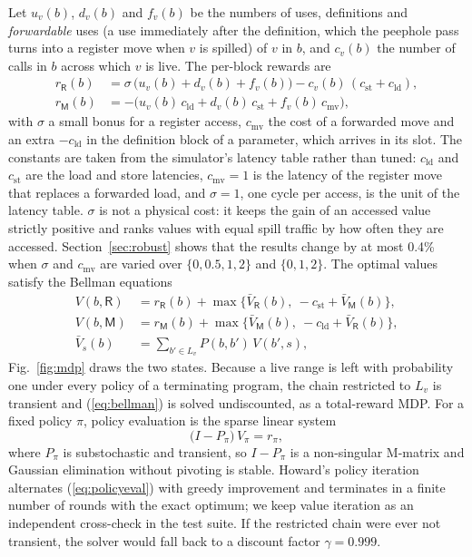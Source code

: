 \documentclass{ieeeaccess}
\newcommand{\Reg}{\mathsf{R}}
\newcommand{\Mem}{\mathsf{M}}
\newcommand{\cld}{c_{\mathrm{ld}}}
\newcommand{\cst}{c_{\mathrm{st}}}
\newcommand{\csv}{\sigma}
\newcommand{\cmv}{c_{\mathrm{mv}}}
\begin{document}
Let $u_v(b)$, $d_v(b)$ and $f_v(b)$ be the numbers of uses,
definitions and \emph{forwardable} uses (a use immediately after the
definition, which the peephole pass turns into a register move when $v$
is spilled) of $v$ in $b$, and $c_v(b)$ the number of calls in $b$
across which $v$ is live. The per-block rewards are
\begin{equation}
\begin{aligned}
r_\Reg(b) &= \csv\,\big(u_v(b)+d_v(b)+f_v(b)\big)-c_v(b)\,(\cst+\cld),\\
r_\Mem(b) &= -\big(u_v(b)\,\cld + d_v(b)\,\cst + f_v(b)\,\cmv\big),
\end{aligned}
\label{eq:reward}
\end{equation}
with $\csv$ a small bonus for a register access, $\cmv$ the cost of a
forwarded move and an extra $-\cld$ in the definition block of a
parameter, which arrives in its slot. The constants are taken from the
simulator's latency table rather than tuned: $\cld$ and $\cst$ are the
load and store latencies, $\cmv=1$ is the latency of the register move
that replaces a forwarded load, and $\csv=1$, one cycle per access,
is the unit of the latency table. $\csv$ is not a physical cost: it
keeps the gain of an accessed value strictly positive and ranks values
with equal spill traffic by how often they are accessed.
Section~\ref{sec:robust} shows that the results change by at most
0.4\% when $\csv$ and $\cmv$ are varied over $\{0,0.5,1,2\}$ and
$\{0,1,2\}$. The optimal values satisfy the
Bellman equations~\cite{bellman1957,puterman1994}
\begin{equation}
\begin{aligned}
V(b,\Reg) &= r_\Reg(b) + \max\big\{\bar V_\Reg(b),\ -\cst + \bar V_\Mem(b)\big\},\\
V(b,\Mem) &= r_\Mem(b) + \max\big\{\bar V_\Mem(b),\ -\cld + \bar V_\Reg(b)\big\},\\
\bar V_s(b) &= \textstyle\sum_{b'\in L_v} P(b,b')\,V(b',s),
\end{aligned}
\label{eq:bellman}
\end{equation}
Fig.~\ref{fig:mdp} draws the two states. Because a live range is left
with probability one under every policy of a terminating program, the
chain restricted to $L_v$ is transient and (\ref{eq:bellman}) is solved
undiscounted, as a total-reward MDP. For a fixed policy $\pi$, policy
evaluation is the sparse linear system
\begin{equation}
\big(I-P_\pi\big)\,V_\pi = r_\pi ,
\label{eq:policyeval}
\end{equation}
where $P_\pi$ is substochastic and transient, so $I-P_\pi$ is a
non-singular M-matrix and Gaussian elimination without pivoting is
stable. Howard's policy iteration~\cite{howard1960} alternates
(\ref{eq:policyeval}) with greedy improvement and terminates in a finite
number of rounds with the exact optimum; we keep value iteration as an
independent cross-check in the test suite. If the restricted chain
were ever not transient, the solver would fall back to a discount factor
$\gamma=0.999$.
\end{document}
